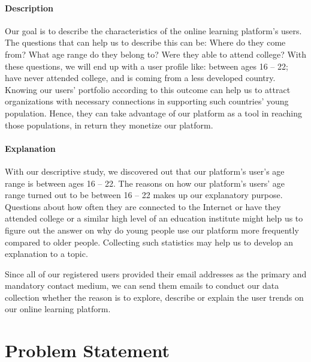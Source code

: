 \paragraph{Description}
Our goal is to describe the characteristics of the online learning platform's users. The questions that can help us to describe this can be: Where do they come from? What age range do they belong to? Were they able to attend college? With these questions, we will end up with a user profile like: between ages 16 -- 22; have never attended college, and is coming from a less developed country. Knowing our users' portfolio according to this outcome can help us to attract organizations with necessary connections in supporting such countries' young population. Hence, they can take advantage of our platform as a tool in reaching those populations, in return they monetize our platform.

\paragraph{Explanation}
With our descriptive study, we discovered out that our platform's user's age range is between ages 16 -- 22. The reasons on how our platform's users' age range turned out to be between 16 -- 22 makes up our explanatory purpose. Questions about how often they are connected to the Internet or have they attended college or a similar high level of an education institute might help us to figure out the answer on why do young people use our platform more frequently compared to older people. Collecting such statistics may help us to develop an explanation to a topic.

\vspace{1cm}
Since all of our registered users provided their email addresses as the primary and mandatory contact medium, we can send them emails to conduct our data collection whether the reason is to explore, describe or explain the user trends on our online learning platform.

\section{Problem Statement}
\label{sec:2:Problem}

